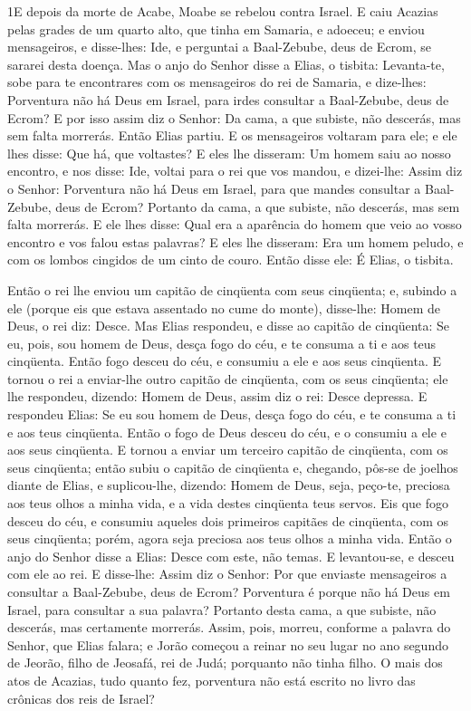 
\lettrine{1} E depois da morte de Acabe, Moabe se rebelou
contra Israel. E caiu Acazias pelas grades de um quarto alto,
que tinha em Samaria, e adoeceu; e enviou mensageiros, e disse-lhes:
Ide, e perguntai a Baal-Zebube, deus de Ecrom, se sararei desta
doença. Mas o anjo do Senhor disse a Elias, o tisbita:
Levanta-te, sobe para te encontrares com os mensageiros do rei de
Samaria, e dize-lhes: Porventura não há Deus em Israel, para irdes
consultar a Baal-Zebube, deus de Ecrom? E por isso assim diz o
Senhor: Da cama, a que subiste, não descerás, mas sem falta
morrerás. Então Elias partiu. E os mensageiros voltaram para
ele; e ele lhes disse: Que há, que voltastes? E eles lhe
disseram: Um homem saiu ao nosso encontro, e nos disse: Ide, voltai
para o rei que vos mandou, e dizei-lhe: Assim diz o Senhor:
Porventura não há Deus em Israel, para que mandes consultar a
Baal-Zebube, deus de Ecrom? Portanto da cama, a que subiste, não
descerás, mas sem falta morrerás. E ele lhes disse: Qual era a
aparência do homem que veio ao vosso encontro e vos falou estas
palavras? E eles lhe disseram: Era um homem peludo, e com os
lombos cingidos de um cinto de couro. Então disse ele: É Elias, o
tisbita.

Então o rei lhe enviou um capitão de cinqüenta com seus cinqüenta;
e, subindo a ele (porque eis que estava assentado no cume do monte),
disse-lhe: Homem de Deus, o rei diz: Desce. Mas Elias
respondeu, e disse ao capitão de cinqüenta: Se eu, pois, sou homem
de Deus, desça fogo do céu, e te consuma a ti e aos teus cinqüenta.
Então fogo desceu do céu, e consumiu a ele e aos seus cinqüenta.
E tornou o rei a enviar-lhe outro capitão de cinqüenta, com
os seus cinqüenta; ele lhe respondeu, dizendo: Homem de Deus, assim
diz o rei: Desce depressa. E respondeu Elias: Se eu sou homem
de Deus, desça fogo do céu, e te consuma a ti e aos teus cinqüenta.
Então o fogo de Deus desceu do céu, e o consumiu a ele e aos seus
cinqüenta. E tornou a enviar um terceiro capitão de
cinqüenta, com os seus cinqüenta; então subiu o capitão de cinqüenta
e, chegando, pôs-se de joelhos diante de Elias, e suplicou-lhe,
dizendo: Homem de Deus, seja, peço-te, preciosa aos teus olhos a
minha vida, e a vida destes cinqüenta teus servos. Eis que
fogo desceu do céu, e consumiu aqueles dois primeiros capitães de
cinqüenta, com os seus cinqüenta; porém, agora seja preciosa aos
teus olhos a minha vida. Então o anjo do Senhor disse a
Elias: Desce com este, não temas. E levantou-se, e desceu com ele ao
rei. E disse-lhe: Assim diz o Senhor: Por que enviaste
mensageiros a consultar a Baal-Zebube, deus de Ecrom? Porventura é
porque não há Deus em Israel, para consultar a sua palavra? Portanto
desta cama, a que subiste, não descerás, mas certamente morrerás.
Assim, pois, morreu, conforme a palavra do Senhor, que Elias
falara; e Jorão começou a reinar no seu lugar no ano segundo de
Jeorão, filho de Jeosafá, rei de Judá; porquanto não tinha filho.
O mais dos atos de Acazias, tudo quanto fez, porventura não
está escrito no livro das crônicas dos reis de Israel?

